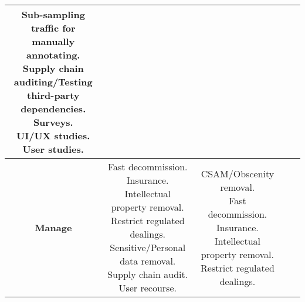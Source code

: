 \documentclass[fleqn]{article}
\begin{document}
\begin{landscape}
\begin{table}[H]
\begin{tabular}{|c|c|c|c|c|}
{			\textbullet\hspace{3pt} Sub-sampling traffic for manually \\\hspace{10pt}annotating. \\
			\textbullet\hspace{3pt} Supply chain auditing/Testing \\\hspace{10pt}third-party dependencies. \\			
			\textbullet\hspace{3pt} Surveys. \\			
			\textbullet\hspace{3pt} UI/UX studies. \\			
			\textbullet\hspace{3pt} User studies. \\
		}
		\\
		\hline		
		\textbf{Manage} &  \makecell[l]{
			\textbullet\hspace{3pt} Fast decommission. \\ 	
			\textbullet\hspace{3pt} Insurance. \\ 	
			\textbullet\hspace{3pt} Intellectual property removal. \\ 			
			\textbullet\hspace{3pt} Restrict regulated dealings. \\ 	
			\textbullet\hspace{3pt} Sensitive/Personal data removal. \\ 	
			\textbullet\hspace{3pt} Supply chain audit. \\ 	
			\textbullet\hspace{3pt} User recourse. \\ 		 	
		}
		& \makecell[l]{
			\textbullet\hspace{3pt} CSAM/Obscenity removal. \\ 	
			\textbullet\hspace{3pt} Fast decommission. \\ 	
			\textbullet\hspace{3pt} Insurance. \\ 	
			\textbullet\hspace{3pt} Intellectual property removal. \\ 	
			\textbullet\hspace{3pt} Restrict regulated dealings. \\ 	
}
\end{tabular}
\end{table}
\end{landscape}
\end{document}
